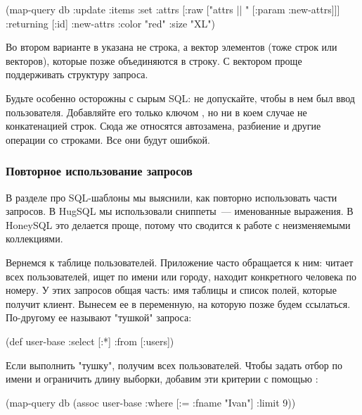 \begin{english}
  \begin{clojure}
(map-query
 db
 {:update :items
  :set {:attrs [:raw ["attrs || " [:param :new-attrs]]]}
  :returning [:id]}
 {:new-attrs {:color "red" :size "XL"}})
  \end{clojure}
\end{english}

Во втором варианте в  указана не строка, а вектор элементов (тоже строк или векторов), которые позже объединяются в строку. С вектором проще поддерживать структуру запроса.

Будьте особенно осторожны с сырым SQL: не допускайте, чтобы в нем был ввод пользователя. Добавляйте его только ключом , но ни в коем случае не конкатенацией строк. Сюда же относятся автозамена, разбиение и другие операции со строками. Все они будут ошибкой.

\subsubsection{Повторное использование запросов}

В разделе про SQL-шаблоны мы выяснили, как повторно использовать части запросов. В HugSQL мы использовали сниппеты~--- именованные выражения. В HoneySQL это делается проще, потому что сводится к работе с неизменяемыми коллекциями.

Вернемся к таблице пользователей. Приложение часто обращается к ним: читает всех пользователей, ищет по имени или городу, находит конкретного человека по номеру. У этих запросов общая часть: имя таблицы и список полей, которые получит клиент. Вынесем ее в переменную, на которую позже будем ссылаться. По-другому ее называют "тушкой" запроса:

\begin{english}
  \begin{clojure}
(def user-base
  {:select [:*]
   :from [:users]})
  \end{clojure}
\end{english}

Если выполнить "тушку", получим всех пользователей. Чтобы задать отбор по имени и ограничить длину выборки, добавим эти критерии с помощью :

\begin{english}
  \begin{clojure}
(map-query db (assoc user-base
                     :where [:= :fname "Ivan"]
                     :limit 9))
  \end{clojure}
\end{english}

